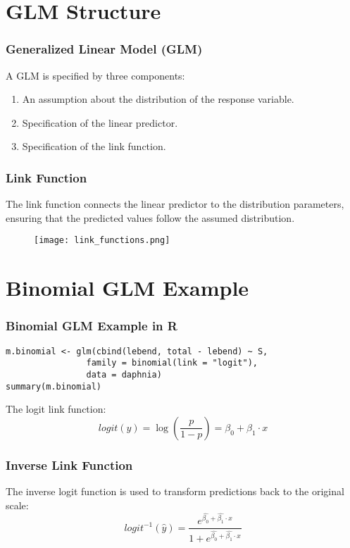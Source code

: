 \documentclass{beamer}
\begin{document}
\section{GLM Structure}

\begin{frame}
    \frametitle{Generalized Linear Model (GLM)}
    A GLM is specified by three components:
    \begin{enumerate}
        \item An assumption about the distribution of the response variable.
        \item Specification of the linear predictor.
        \item Specification of the link function.
    \end{enumerate}
\end{frame}

\begin{frame}
    \frametitle{Link Function}
    The link function connects the linear predictor to the distribution parameters, ensuring that the predicted values follow the assumed distribution.
    
    \begin{figure}
        \centering
        \texttt{[image: link\_functions.png]}
    \end{figure}
\end{frame}

\section{Binomial GLM Example}

\begin{frame}
    \frametitle{Binomial GLM Example in R}
    \lstset{style=Rstyle}
    \begin{lstlisting}
m.binomial <- glm(cbind(lebend, total - lebend) ~ S, 
                family = binomial(link = "logit"), 
                data = daphnia)
summary(m.binomial)
    \end{lstlisting}
    
    The logit link function:
    \[
    logit(\hat{y}) = \log\left(\frac{p}{1 - p}\right) = \beta_0 + \beta_1 \cdot x
    \]
\end{frame}

\begin{frame}
    \frametitle{Inverse Link Function}
    The inverse logit function is used to transform predictions back to the original scale:
    \[
    logit^{-1}(\hat{y}) = \frac{e^{\hat{\beta_0} + \hat{\beta_1} \cdot x}}{1 + e^{\hat{\beta_0} + \hat{\beta_1} \cdot x}}
    \]
\end{frame}
\end{document}
